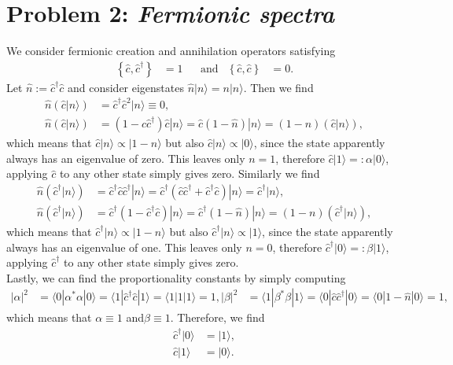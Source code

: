 \documentclass[english, parskip=full]{scrartcl}
\newcommand{\braket}{}
\newcommand{\kla}{}
\newcommand{\klammer}{}
\newcommand{\tecxt}{}
\newcommand{\Ket}{}
\begin{document}
\section*{Problem 2: \normalfont\textit{\large{Fermionic spectra}}}
We consider fermionic creation and annihilation operators satisfying
\begin{align}
\klammer\left\{ \hat{c}, \hat{c}^\dagger \right\}&=1 && \tecxt\text{and} & \klammer\left\{ \hat{c},\hat{c} \right\}&= 0.
\end{align}
Let $\hat{n}:=\hat{c}^\dagger\hat{c}$ and consider eigenstates $\hat{n}\Ket | n \rangle=n\Ket | n \rangle$.
Then we find
\begin{align}
\hat{n}\kla\left( \hat{c}\Ket | n \rangle \right) &= \hat{c}^\dagger\hat{c}^2\Ket | n \rangle\equiv 0,\\
\hat{n}\kla\left( \hat{c}\Ket | n \rangle \right) &= \kla\left( 1 - \hat{c}\hat{c}^\dagger \right)\hat{c}\Ket | n \rangle = \hat{c}\kla\left( 1-\hat{n} \right)\Ket | n \rangle=(1-n)\kla\left( \hat{c}\Ket | n \rangle \right),
\end{align}
which means that $\hat{c}\Ket | n \rangle\propto \Ket | 1-n \rangle$ but also $\hat{c}\Ket | n \rangle\propto\Ket | 0 \rangle$, since the state apparently always has an eigenvalue of zero.
This leaves only $n=1$, therefore $\hat{c}\Ket | 1 \rangle =:\alpha\Ket | 0 \rangle$, applying $\hat{c}$ to any other state simply gives zero.
Similarly we find
\begin{align}
\hat{n}\kla\left( \hat{c}^\dagger\Ket | n \rangle \right) &= \hat{c}^\dagger\hat{c}\hat{c}^\dagger\Ket | n \rangle = \hat{c}^\dagger\kla\left( \hat{c}\hat{c}^\dagger + \hat{c}^\dagger\hat{c} \right)\Ket | n \rangle=\hat{c}^\dagger\Ket | n \rangle,\\
\hat{n}\kla\left( \hat{c}^\dagger \Ket | n \rangle \right) &= \hat{c}^\dagger\kla\left( 1 - \hat{c}^\dagger\hat{c} \right)\Ket | n \rangle = \hat{c}^\dagger\kla\left( 1-\hat{n} \right)\Ket | n \rangle=(1-n)\kla\left( \hat{c}^\dagger\Ket | n \rangle \right),
\end{align}
which means that $\hat{c}^\dagger\Ket | n \rangle\propto \Ket | 1-n \rangle$ but also $\hat{c}^\dagger\Ket | n \rangle\propto\Ket | 1 \rangle$, since the state apparently always has an eigenvalue of one.
This leaves only $n=0$, therefore $\hat{c}^\dagger\Ket | 0 \rangle =:\beta\Ket | 1 \rangle$, applying $\hat{c}^\dagger$ to any other state simply gives zero.\\
Lastly, we can find the proportionality constants by simply computing
\begin{align}
|\alpha|^2&=\braket\langle 0 | \alpha^\ast\alpha | 0 \rangle=\braket\langle 1 | \hat{c}^\dagger\hat{c} | 1 \rangle=\braket\langle 1 | 1 | 1 \rangle=1,
|\beta|^2&=\braket\langle 1 | \beta^\ast\beta | 1 \rangle = \braket\langle 0 | \hat{c}\hat{c}^\dagger | 0 \rangle=\braket\langle 0 | 1 - \hat{n} | 0 \rangle=1,
\end{align}
which means that $\alpha\equiv 1$ and$ \beta\equiv 1$.
Therefore, we find
\begin{align}
\hat{c}^\dagger\Ket | 0 \rangle &= \Ket | 1 \rangle,\\
\hat{c}\Ket | 1 \rangle &= \Ket | 0 \rangle.
\end{align}
\end{document}

